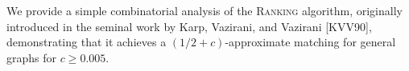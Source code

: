 
We provide a simple combinatorial analysis of the \textsc{Ranking} algorithm, originally introduced in the seminal work by Karp, Vazirani, and Vazirani [KVV90], demonstrating that it achieves a $(1/2 + c)$-approximate matching for general graphs for  $c \geq  0.005$.
